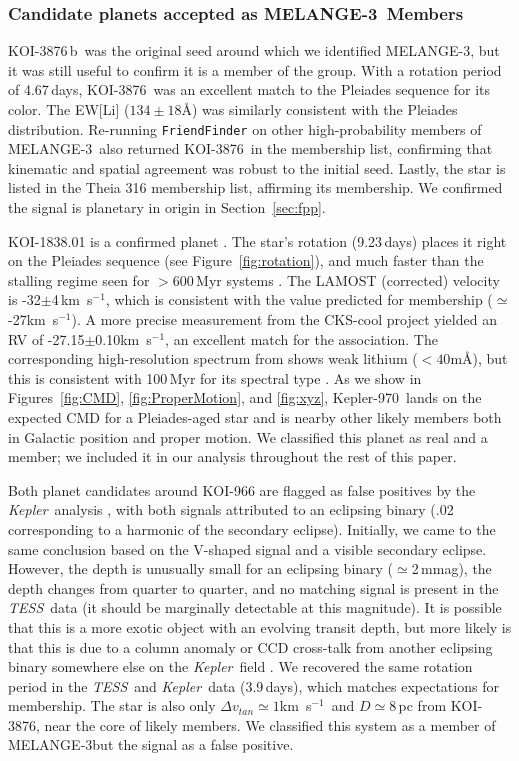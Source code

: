 \documentclass[twocolumn, linenumbers]{aastex631}
\newcommand{\association}{MELANGE-3}
\newcommand{\starname}{KOI-3876}
\newcommand{\planetname}{KOI-3876\,b}
\newcommand{\starnametwo}{Kepler-970}
\newcommand{\kepler}{{\it Kepler}}
\newcommand\kms{km~s$^{-1}$}
\newcommand{\tess}{\textit{TESS}}
\begin{document}
\subsubsection{Candidate planets accepted as \association\ Members}\label{sec:acceptedMems}

\planetname\ was the original seed around which we identified \association, but it was still useful to confirm it is a member of the group. With a rotation period of 4.67\,days, \starname\ was an excellent match to the Pleiades sequence for its color. The EW[Li] ($134\pm18$\AA) was similarly consistent with the Pleiades distribution. Re-running \texttt{FriendFinder} on other high-probability members of \association\ also returned \starname\ in the membership list, confirming that kinematic and spatial agreement was robust to the initial seed. Lastly, the star is listed in the Theia 316 membership list, affirming its membership. We confirmed the signal is planetary in origin in Section~\ref{sec:fpp}. 

KOI-1838.01 is a confirmed planet \citep[Kepler-970 b;][]{2016ApJ...822...86M}. The star's rotation (9.23\,days) places it right on the Pleiades sequence (see Figure~\ref{fig:rotation}), and much faster than the stalling regime seen for $>600$\,Myr systems \citep{Curtis_stall}. The LAMOST (corrected) velocity is -32$\pm$4\,\kms, which is consistent with the value predicted for membership ($\simeq$-27\kms). A more precise measurement from the CKS-cool project \citet{CKS_cool} yielded an RV of -27.15$\pm$0.10\kms, an excellent match for the association. The corresponding high-resolution spectrum from \citet{CKS_cool} shows weak lithium ($<40$m\AA), but this is consistent with 100\,Myr for its spectral type \citep{BHAC15}. As we show in Figures~\ref{fig:CMD}, \ref{fig:ProperMotion}, and \ref{fig:xyz}, \starnametwo\ lands on the expected CMD for a Pleiades-aged star and is nearby other likely members both in Galactic position and proper motion. We classified this planet as real and a member; we included it in our analysis throughout the rest of this paper. 

Both planet candidates around KOI-966 are flagged as false positives by the \kepler\ analysis \citep{2016ApJS..224...12C, EXOFOP_Kepler}, with both signals attributed to an eclipsing binary (.02 corresponding to a harmonic of the secondary eclipse). Initially, we came to the same conclusion based on the V-shaped signal and a visible secondary eclipse. However, the depth is unusually small for an eclipsing binary ($\simeq$2\,mmag), the depth changes from quarter to quarter, and no matching signal is present in the \tess\ data (it should be marginally detectable at this magnitude). It is possible that this is a more exotic object with an evolving transit depth, but more likely is that this is due to a column anomaly or CCD cross-talk from another eclipsing binary somewhere else on the \kepler\ field \citep[for more details see][]{2014AJ....147..119C}. We recovered the same rotation period in the \tess\ and \kepler\ data (3.9\,days), which matches expectations for membership. The star is also only $\Delta v_{tan} \simeq 1$\kms\ and $D \simeq 8$\,pc from \starname, near the core of likely members. We classified this system as a member of \association but the signal as a false positive.
\end{document}
